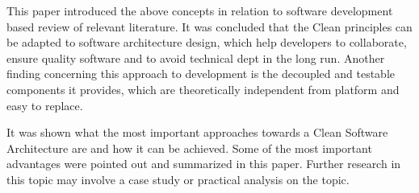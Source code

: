 \documentclass[conference]{IEEEtran}
\begin{document}
This paper introduced the above concepts in relation to software development based review of relevant literature. It was concluded that the Clean principles can be adapted to software architecture design, which help developers to collaborate, ensure quality software and to avoid technical dept in the long run. Another finding concerning this approach to development is the decoupled and testable components it provides, which are theoretically independent from platform and easy to replace. 

It was shown what the most important approaches towards a Clean Software Architecture are and how it can be achieved. Some of the most important advantages were pointed out and summarized in this paper. Further research in this topic may involve a case study or practical analysis on the topic. 
\end{document}

